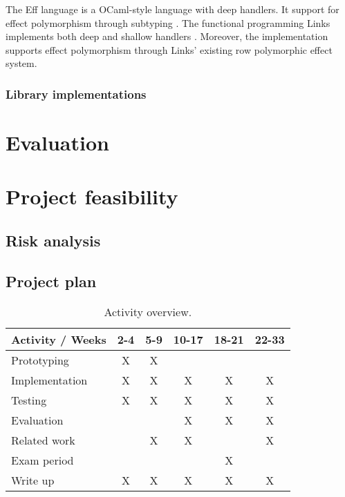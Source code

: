 \documentclass[a4paper,11pt,twoside]{article}
\begin{document}
The Eff language is a OCaml-style language with deep handlers. It support for effect polymorphism through subtyping \cite{Bauer2015}. 
The functional programming Links implements both deep and shallow handlers \cite{Hillerstrom2015}. Moreover, the implementation supports effect polymorphism through Links' existing row polymorphic effect system.
    
  \subsubsection{Library implementations}\label{sec:library}

  \section{Evaluation}

  \section{Project feasibility}
  \subsection{Risk analysis}

  \subsection{Project plan}
  \begin{table}[H]
    \centering
    \begin{tabular}{ | l | c | c | c | c | c | }
      \hline
      \multicolumn{1}{|c|}{Activity / Weeks} & 2-4 & 5-9 & 10-17 & 18-21 & 22-33 \\
      \hline
      Prototyping    & X & X & & & \\
      \hline
      Implementation & X & X & X & X & X \\
      \hline
      Testing        & X & X & X & X & X \\
      \hline
      Evaluation     &   &   & X & X & X \\
      \hline
      Related work   &   & X & X &   & X \\
      \hline
      Exam period    &   &   &   & X &   \\
      \hline
      Write up       & X & X & X & X & X  \\
      \hline
    \end{tabular}\caption{Activity overview.}
  \end{table}
  \printbibliography[heading=bibintoc]
\end{document}
